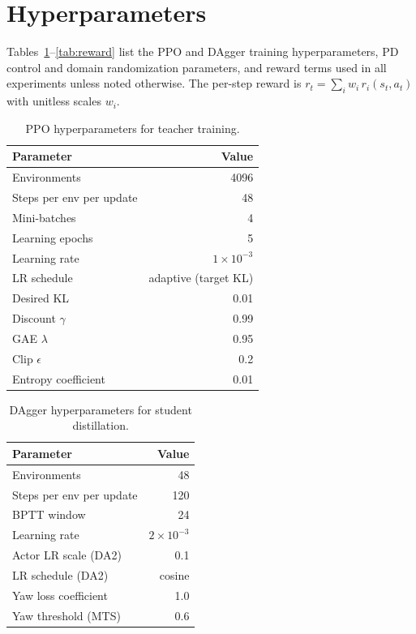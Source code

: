 \appendix
\section{Hyperparameters}
\label{sec:hyperparameters}

Tables~\ref{tab:ppo_params}--\ref{tab:reward} list the PPO and DAgger
training hyperparameters, PD control and domain randomization
parameters, and reward terms used in all experiments unless noted
otherwise.  The per-step reward is
$r_t = \sum_i w_i \, r_i(s_t, a_t)$ with unitless scales $w_i$.

\begin{table}[h]
	\centering
	\caption{PPO hyperparameters for teacher training.}
	\label{tab:ppo_params}
	\small
	\begin{tabular}{@{}lr@{}}
		\toprule
		Parameter                & Value                \\
		\midrule
		Environments             & 4096                 \\
		Steps per env per update & 48                   \\
		Mini-batches             & 4                    \\
		Learning epochs          & 5                    \\
		Learning rate            & $1 \times 10^{-3}$   \\
		LR schedule              & adaptive (target KL) \\
		Desired KL               & 0.01                 \\
		Discount $\gamma$        & 0.99                 \\
		GAE $\lambda$            & 0.95                 \\
		Clip $\epsilon$          & 0.2                  \\
		Entropy coefficient      & 0.01                 \\
		\bottomrule
	\end{tabular}
\end{table}

\begin{table}[h]
	\centering
	\caption{DAgger hyperparameters for student distillation.}
	\label{tab:dagger_params}
	\small
	\begin{tabular}{@{}lr@{}}
		\toprule
		Parameter                & Value              \\
		\midrule
		Environments             & 48                 \\
		Steps per env per update & 120                \\
		BPTT window              & 24                 \\
		Learning rate            & $2 \times 10^{-3}$ \\
		Actor LR scale (DA2)     & 0.1                \\
		LR schedule (DA2)        & cosine             \\
		Yaw loss coefficient     & 1.0                \\
		Yaw threshold (MTS)      & 0.6                \\
		\bottomrule
	\end{tabular}
\end{table}

